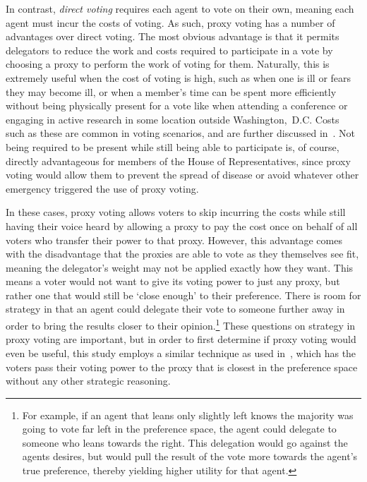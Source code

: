 In contrast, \textit{direct voting} requires each agent to vote on their own, meaning
each agent must incur the costs of voting.
As such, proxy voting has a number of advantages over direct voting.
The most obvious advantage is that it permits delegators to reduce the work and costs
required to participate in a vote by choosing a proxy to perform the work of voting
for them.
Naturally, this is extremely useful when the cost of voting is high, such as
when one is ill or fears they may become ill, or when a member's time can be spent
more efficiently without being physically present for a vote like when attending a
conference or engaging in active research in some location outside {Washington,~D.C}.
Costs such as these are common in voting scenarios, and are further discussed
in~\cite{Gershtein2019}.
Not being required to be present while still being able to participate is, of course,
directly advantageous for members of the House of Representatives, since proxy voting
would allow them to prevent the spread of disease or avoid whatever other emergency
triggered the use of proxy voting.

In these cases, proxy voting allows voters to skip incurring the costs while still
having their voice heard by allowing a proxy to pay the cost once on behalf of all
voters who transfer their power to that proxy.
However, this advantage comes with the disadvantage that the proxies are able to vote
as they themselves see fit, meaning the delegator's weight may not be applied exactly
how they want.
This means a voter would not want to give its voting power to just any proxy, but
rather one that would still be `close enough' to their preference.
There is room for strategy in that an agent could delegate their vote to someone
further away in order to bring the results closer to their opinion.\footnote{
    For example, if an agent that leans only slightly left knows the majority was going
    to vote far left in the preference space, the agent could delegate to someone who
    leans towards the right.
    This delegation would go against the agents desires, but would pull the result of
    the vote more towards the agent's true preference, thereby yielding higher
    utility for that agent.
}
These questions on strategy in proxy voting are important, but in order to first
determine if proxy voting would even be useful, this study employs a similar technique
as used in~\cite{Cohensius2017}, which has the voters pass their voting power to the
proxy that is closest in the preference space without any other strategic reasoning.

